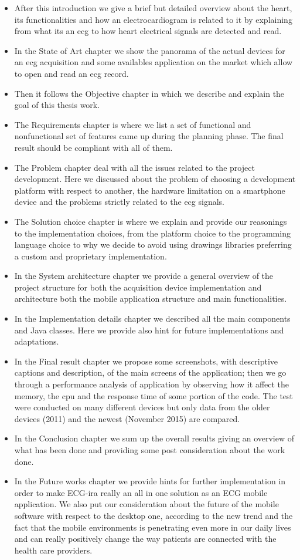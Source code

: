 \begin{itemize}
	\item After this introduction we give a brief but detailed overview about the heart, its functionalities and how an electrocardiogram is related to it by explaining from what its an ecg to how heart electrical signals are detected and read.
	\item In the State of Art chapter we show the panorama of the actual devices for an ecg acquisition and some availables application on the market which allow to open and read an ecg record.
	\item Then it follows the Objective chapter in which we describe and explain the goal of this thesis work.
	\item The Requirements chapter is where we list a set of functional and nonfunctional set of features came up during the planning phase. The final result should be compliant with all of them.
	\item The Problem chapter deal with all the issues related to the project development. Here we discussed about the problem of choosing a development platform with respect to another, the hardware limitation on a smartphone device and the problems strictly related to the ecg signals.
	\item The Solution choice chapter is where we explain and provide our reasonings to the implementation choices, from the platform choice to the programming language choice to why we decide to avoid using drawings libraries preferring a custom and proprietary implementation.  
	\item In the System architecture chapter we provide a general overview of the project structure for both the acquisition device implementation and architecture both the mobile application structure and main functionalities.
	\item In the Implementation details chapter we described all the main components and Java classes. Here we provide also hint for future implementations and adaptations.
	\item In the Final result chapter we propose some screenshots, with descriptive captions and description, of the main screens of the application; then we go through a performance analysis of application by observing how it affect the memory, the cpu and the response time of some portion of the code. The test were conducted on many different devices but only data from the older devices (2011) and the newest (November 2015) are compared.
	\item In the Conclusion chapter we sum up the overall results giving an overview of what has been done and providing some post consideration about the work done.
	\item In the Future works chapter we provide hints for further implementation in order to make ECG-ira really an all in one solution as an ECG mobile application. We also put our consideration about the future of the mobile software with respect to the desktop one, according to the new trend and the fact that the mobile environments is penetrating even more in our daily lives and can really positively change the way patients are connected with the health care providers.
\end{itemize}